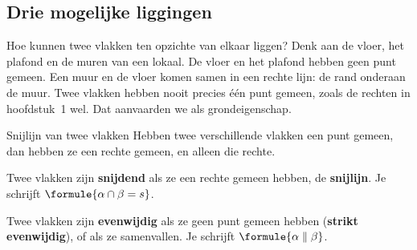 \subsection{Drie mogelijke liggingen}

Hoe kunnen twee vlakken ten opzichte van elkaar liggen? Denk aan de vloer, het plafond en de muren van een lokaal. De vloer en het plafond hebben geen punt gemeen. Een muur en de vloer komen samen in een rechte lijn: de rand onderaan de muur. Twee vlakken hebben nooit precies één punt gemeen, zoals de rechten in hoofdstuk~1 wel. Dat aanvaarden we als grondeigenschap.

\begin{theorie}
\begin{stelling}{Snijlijn van twee vlakken}
Hebben twee verschillende vlakken een punt gemeen, dan hebben ze een rechte gemeen, en alleen die rechte.
\end{stelling}
\end{theorie}


\begin{theorie}
Twee vlakken zijn \textbf{\textcolor{accent}{snijdend}} als ze een rechte gemeen hebben, de \textbf{\textcolor{accent}{snijlijn}}. Je schrijft $\formule{\alpha \cap \beta = s}$.

Twee vlakken zijn \textbf{\textcolor{accent}{evenwijdig}} als ze geen punt gemeen hebben (\textbf{\textcolor{accent}{strikt evenwijdig}}), of als ze samenvallen. Je schrijft $\formule{\alpha \parallel \beta}$.
\end{theorie}

